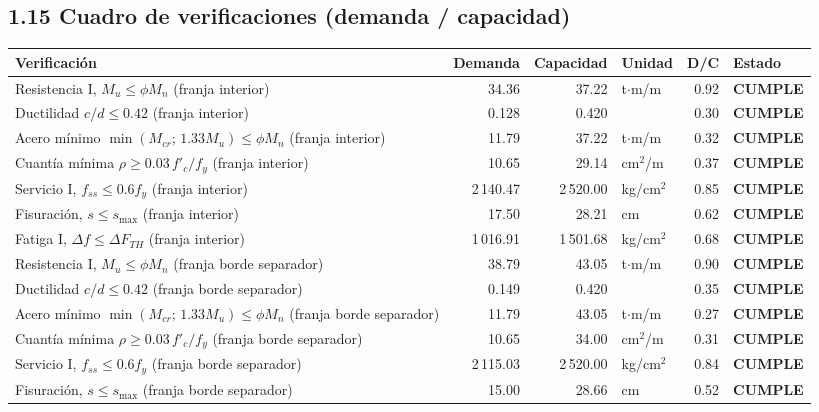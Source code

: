 \documentclass[11pt,a4paper]{article}
\begin{document}
\subsection*{1.15 Cuadro de verificaciones (demanda / capacidad)}
\begin{center}\small
\begin{tabular}{p{7.4cm}rrlrl}
\toprule
Verificación & Demanda & Capacidad & Unidad & D/C & Estado\\
\midrule
Resistencia I, $M_u \le \phi M_n$ (franja interior) & 34.36 & 37.22 & t$\cdot$m/m & 0.92 & \textcolor{ok}{\textbf{CUMPLE}} \\
Ductilidad $c/d \le 0.42$ (franja interior) & 0.128 & 0.420 &  & 0.30 & \textcolor{ok}{\textbf{CUMPLE}} \\
Acero mínimo $\min(M_{cr};\,1.33M_u) \le \phi M_n$ (franja interior) & 11.79 & 37.22 & t$\cdot$m/m & 0.32 & \textcolor{ok}{\textbf{CUMPLE}} \\
Cuantía mínima $\rho \ge 0.03\,f'_c/f_y$ (franja interior) & 10.65 & 29.14 & cm$^2$/m & 0.37 & \textcolor{ok}{\textbf{CUMPLE}} \\
Servicio I, $f_{ss} \le 0.6 f_y$ (franja interior) & 2\,140.47 & 2\,520.00 & kg/cm$^2$ & 0.85 & \textcolor{ok}{\textbf{CUMPLE}} \\
Fisuración, $s \le s_{\max}$ (franja interior) & 17.50 & 28.21 & cm & 0.62 & \textcolor{ok}{\textbf{CUMPLE}} \\
Fatiga I, $\Delta f \le \Delta F_{TH}$ (franja interior) & 1\,016.91 & 1\,501.68 & kg/cm$^2$ & 0.68 & \textcolor{ok}{\textbf{CUMPLE}} \\
Resistencia I, $M_u \le \phi M_n$ (franja borde separador) & 38.79 & 43.05 & t$\cdot$m/m & 0.90 & \textcolor{ok}{\textbf{CUMPLE}} \\
Ductilidad $c/d \le 0.42$ (franja borde separador) & 0.149 & 0.420 &  & 0.35 & \textcolor{ok}{\textbf{CUMPLE}} \\
Acero mínimo $\min(M_{cr};\,1.33M_u) \le \phi M_n$ (franja borde separador) & 11.79 & 43.05 & t$\cdot$m/m & 0.27 & \textcolor{ok}{\textbf{CUMPLE}} \\
Cuantía mínima $\rho \ge 0.03\,f'_c/f_y$ (franja borde separador) & 10.65 & 34.00 & cm$^2$/m & 0.31 & \textcolor{ok}{\textbf{CUMPLE}} \\
Servicio I, $f_{ss} \le 0.6 f_y$ (franja borde separador) & 2\,115.03 & 2\,520.00 & kg/cm$^2$ & 0.84 & \textcolor{ok}{\textbf{CUMPLE}} \\
Fisuración, $s \le s_{\max}$ (franja borde separador) & 15.00 & 28.66 & cm & 0.52 & \textcolor{ok}{\textbf{CUMPLE}} \\

\end{tabular}
\end{center}
\end{document}
